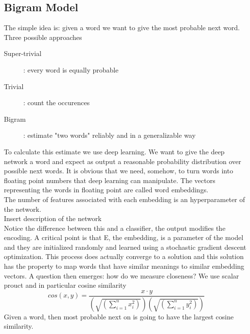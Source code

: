  \subsection{Bigram Model}
 The simple idea is: given a word we want to give the most probable next word. Three possible approaches
 \begin{description}
    \item[Super-trivial]: every word is equally probable
    \item[Trivial]: count the occurences
    \item[Bigram]: estimate "two words" reliably and in a generalizable way   
 \end{description}
 To calculate this estimate we use deep learning. We want to give the deep network a word and expect as output a reasonable probability distribution over possible next words. It is obvious that we need, somehow, to turn words into floating point numbers that deep learning can manipulate. The vectors representing the words in floating point are called word embeddings.\\
 The number of features associated with each embedding is an hyperparameter of the network.\\
 Insert description of the network\\
 Notice the difference between this and a classifier, the output modifies the encoding. A critical point is that E, the embedding, is a parameter of the model and they are initialized randomly and learned using a stochastic gradient descent optimization. This process does actually converge to a solution and this solution has the property to map words that have similar meanings to similar embedding vectors. A question then emerges: how do we measure closeness? We use scalar prouct and in particular cosine similarity 
 \[ 
    cos(x,y) = \frac{x\cdot y}{(\sqrt{(\sum_{i=1}^{n}{x_i^2})})(\sqrt{(\sum_{i=1}^{n}{y_i^2})})} 
 \]
 Given a word, then most probable next on is going to have the largest cosine similarity.
